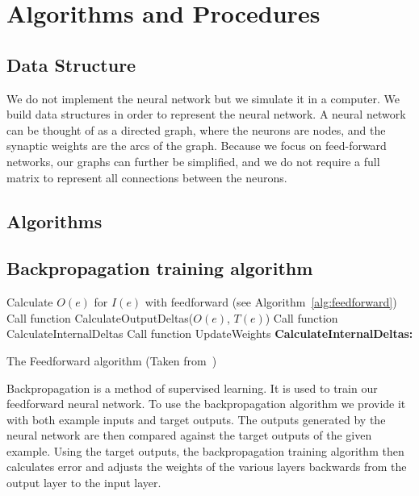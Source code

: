 \documentclass[11pt]{article}
\begin{document}



\section{Algorithms and Procedures} %
\label{sec:algorithms_and_procedures}

\subsection{Data Structure} %
\label{sub:data_structure}

We do not implement the neural network but we simulate it in a computer. We build data structures in order to represent the neural
network. A neural network can be thought of as a directed graph, where the neurons are nodes, and the synaptic weights are the arcs of
the graph. Because we focus on feed-forward networks, our graphs can further be simplified, and we do not require a full matrix to
represent all connections between the neurons.



\subsection{Algorithms} %
\label{sub:algorithms}

\subsection{Backpropagation training algorithm} %
\label{sub:backpropagation_training_algorithm}

\begin{algorithm}%
\SetLine
{}
{
	Calculate $O(e)$ for $I(e)$ with feedforward (see Algorithm~\ref{alg:feedforward})\;
	Call function CalculateOutputDeltas($O(e)$, $T(e)$)\;
	Call function CalculateInternalDeltas\;
	Call function UpdateWeights\;
}
\textbf{CalculateInternalDeltas:}

\caption{The Feedforward algorithm (Taken from~\cite{skapura})}
\label{alg:feedforward}
\end{algorithm}

Backpropagation is a method of supervised learning. It is used to train our feedforward neural network. To use the backpropagation
algorithm we provide it with both example inputs and target outputs. The outputs generated by the neural network are then compared
against the target outputs of the given example. Using the target outputs, the backpropagation training algorithm then calculates error
and adjusts the weights of the various layers backwards from the output layer to the input layer.
\end{document}

